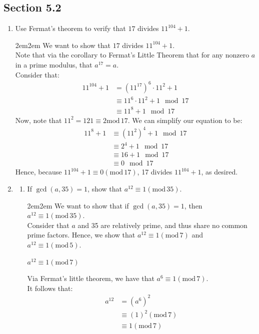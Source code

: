 \documentclass[10pt,oneside]{book}
\newcommand{\gspc}{\vspace{0.13cm}} %
\newcommand{\gline}{\gspc\\} %
\newcommand{\gmod}{\text{mod}\,}
\newcommand{\centerit}[1]{{\begin{center} #1 \end{center}}}
\newcommand{\ul}[1]{\underline{#1}}
\let\endoldproof\endproof
\renewenvironment{proof}[1][\proofname]
  {\vspace{0.2cm}\begin{adjustwidth}{2em}{2em}
   \oldproof[#1]}
  {\endoldproof
\end{adjustwidth}}
\begin{document}
\newcommand{\cg}[1]{\color{OliveGreen}#1\color{white}}
\newcommand{\cb}[1]{\color{BlueViolet}#1\color{white}}

\subsection*{Section 5.2}

\begin{enumerate}
	\item Use Fermat's theorem to verify that $17$ divides $11^{104}+1$.
	\begin{proof}
		We want to show that $17$ divides $11^{104}+1$. \gline
		Note that via the corollary to Fermat's Little Theorem that for any nonzero $a$ in a prime modulus, that $a^{17} = a$.\gline
		Consider that:
		\begin{align*}
			11^{104}+1 &= (11^{17})^6\cdot 11^2 + 1\\
			&\equiv 11^6\cdot 11^2 + 1\mod 17\\
			&\equiv 11^8 + 1 \mod 17
		\end{align*}
		Now, note that $11^2 = 121\equiv 2\gmod 17$. We can simplify our equation to be:
		\begin{align*}
			11^8 + 1 &\equiv (11^2)^4 + 1\mod 17\\
			&\equiv 2^4 + 1\mod 17\\
			&\equiv 16 + 1\mod 17\\
			&\equiv 0 \mod 17
		\end{align*}
		Hence, because $11^{104}+ 1 \equiv 0(\gmod 17)$, 17 divides $11^{104} + 1$, as desired. 
	\end{proof}
	\item \begin{enumerate}
		\item If $\gcd(a, 35)=1$, show that $a^{12}\equiv 1(\gmod 35)$.
		\begin{proof}
			We want to show that if $\gcd(a,35) = 1$, then $a^{12}\equiv 1 (\gmod 35)$. \gline
			Consider that $a$ and 35 are relatively prime, and thus share no common prime factors. Hence, we show that $a^{12}\equiv 1(\gmod 7)$ and $a^{12}\equiv 1(\gmod 5)$.
			\centerit{\ul{$a^{12}\equiv 1 (\gmod 7)$}}
			Via Fermat's little theorem, we have that $a^{6}\equiv 1 (\gmod 7)$. \\
			It follows that: 
			\begin{align*}
				a^{12}&=(a^{6})^2\\
				&\equiv (1)^2(\gmod 7)\\
				&\equiv 1 (\gmod 7)

\end{align*}
\end{proof}
\end{enumerate}
\end{enumerate}
\end{document}
